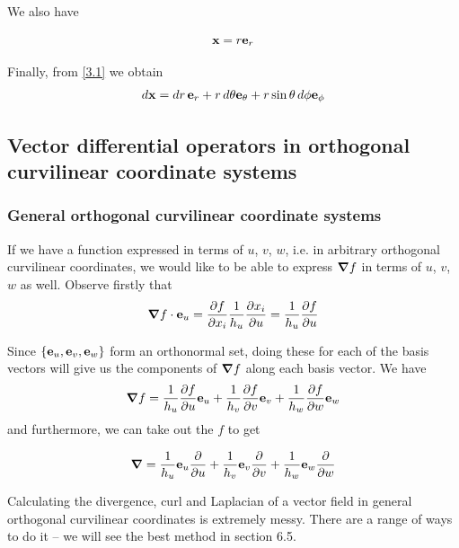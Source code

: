 \documentclass{../../template/note}
\begin{document}
    We also have
    
    \begin{proposition}
        \label{3.5} \[
            \V x = r \V e_r
        \]
    \end{proposition}
    Finally, from \cref{3.1} we obtain
    \begin{align*}
        d\V x = dr\, \V e_r + r \D \theta \V e_\theta + r \sin \theta \D \phi \V e_\phi
    \end{align*}
    
    \subsection{Vector differential operators in orthogonal curvilinear coordinate systems}

    \subsubsection{General orthogonal curvilinear coordinate systems}

    If we have a function expressed in terms of \(u\), \(v\), \(w\), i.e. in arbitrary orthogonal curvilinear coordinates, we would like to be able to express \(\grad f\) in terms of \(u\), \(v\), \(w\) as well. Observe firstly that
    \begin{align*}
        \grad f \cdot \V e_u = \pd{f}{x_i} \frac 1 {h_u}\pd{x_i}{u} = \frac 1 {h_u} \pd{f}{u}
    \end{align*}
    

    Since \(\{\V e_u, \V e_v, \V e_w\}\) form an orthonormal set, doing these for each of the basis vectors will give us the components of \(\grad f\) along each basis vector. We have
    \begin{align*}
        \grad f = \frac 1 {h_u} \pd f u \V e_u + \frac 1 {h_v} \pd f v \V e_v + \frac 1 {h_w} \pd f w \V e_w
    \end{align*}
    and furthermore, we can take out the \(f\) to get
    \begin{proposition}
        \label{3.6} \[
            \grad = \frac 1 {h_u} \V e_u \pd {} u + \frac 1 {h_v} \V e_v \pd {} v + \frac 1 {h_w} \V e_w \pd {} w
        \]
    \end{proposition}
    Calculating the divergence, curl and Laplacian of a vector field in general orthogonal curvilinear coordinates is extremely messy. There are a range of ways to do it -- we will see the best method in section 6.5.
\end{document}
